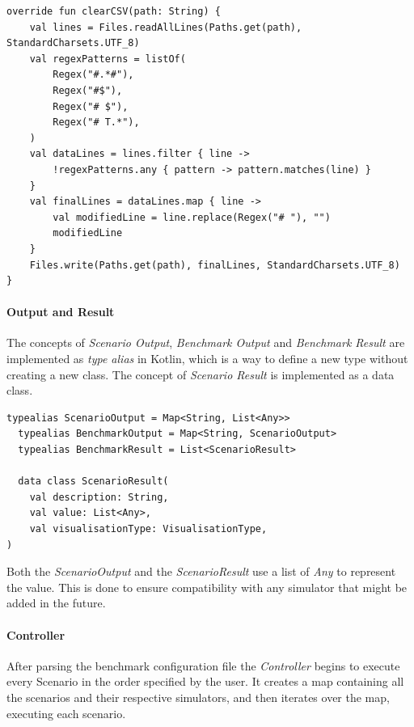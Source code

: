 \documentclass[12pt,a4paper,openright,twoside]{book}
\begin{document}
\begin{lstlisting}[style=my-kotlin, language=my-kotlin, caption={CSV file cleaning in Alchemist.}]
override fun clearCSV(path: String) {
    val lines = Files.readAllLines(Paths.get(path), StandardCharsets.UTF_8)
    val regexPatterns = listOf(
        Regex("#.*#"),
        Regex("#$"),
        Regex("# $"),
        Regex("# T.*"),
    )
    val dataLines = lines.filter { line ->
        !regexPatterns.any { pattern -> pattern.matches(line) }
    }
    val finalLines = dataLines.map { line ->
        val modifiedLine = line.replace(Regex("# "), "")
        modifiedLine
    }
    Files.write(Paths.get(path), finalLines, StandardCharsets.UTF_8)
}
\end{lstlisting}

\paragraph*{Output and Result}

The concepts of \emph{Scenario Output}, \emph{Benchmark Output} and \emph{Benchmark Result} are implemented as \emph{type alias} in Kotlin, which is a way to define a new type without creating a new class.
The concept of \emph{Scenario Result} is implemented as a data class.

\begin{lstlisting}[style=my-kotlin, language=my-kotlin, caption={Benchmark output and result model.}]
  typealias ScenarioOutput = Map<String, List<Any>>
  typealias BenchmarkOutput = Map<String, ScenarioOutput>
  typealias BenchmarkResult = List<ScenarioResult>

  data class ScenarioResult(
    val description: String,
    val value: List<Any>,
    val visualisationType: VisualisationType,
)
\end{lstlisting}

Both the \textit{ScenarioOutput} and the \textit{ScenarioResult} use a list of \emph{Any} to represent the value.
This is done to ensure compatibility with any simulator that might be added in the future.

\paragraph*{Controller}

After parsing the benchmark configuration file the \emph{Controller} begins to execute every Scenario in the order specified by the user.
It creates a map containing all the scenarios and their respective simulators, and then iterates over the map, executing each scenario.
\end{document}
